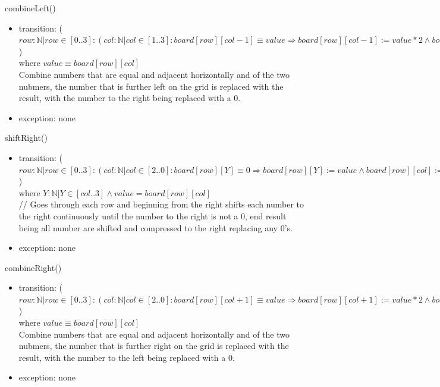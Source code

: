\documentclass[12pt]{article}
\begin{document}
\noindent combineLeft()
\begin{itemize}
    \item transition: ($row : \mathbb{N} \vert row
    \in [0..3]: (col : \mathbb{N} \vert col \in [1..3]: board[row][col-1]
    \equiv value \Rightarrow board[row][col-1] := value * 2 \land
    board[row][col] := 0 \land score := score + value * 2)$)\\
    where $value \equiv board[row][col]$\\
    Combine numbers that are equal and adjacent horizontally and of the two
    nubmers, the number that is further left on the grid is replaced with
    the result, with the number to the right being replaced with a 0.
    \item exception: none
\end{itemize}

\noindent shiftRight()
\begin{itemize}
    \item transition: ($row : \mathbb{N} \vert row
    \in [0..3]: (col : \mathbb{N} \vert col \in [2..0]:
    board[row][Y] \equiv 0 \Rightarrow board[row][Y] := value
    \land board[row][col] := 0)$)\\
    where $Y : \mathbb{N} | Y \in [col .. 3] \land value = board[row][col]$\\
    // Goes through each row and beginning from the right shifts each number
    to the right continuously until the number to the right is not a 0, end result
    being all number are shifted and compressed to the right replacing any
    0's.
    \item exception: none
\end{itemize}

\noindent combineRight()
\begin{itemize}
    \item transition: ($row : \mathbb{N} \vert row
    \in [0..3]: (col : \mathbb{N} \vert col \in [2..0]: board[row][col+1]
    \equiv value \Rightarrow board[row][col+1] := value * 2 \land
    board[row][col] := 0 \land score := score + value * 2)$)\\
    where $value \equiv board[row][col]$\\
    Combine numbers that are equal and adjacent horizontally and of the two
    nubmers, the number that is further right on the grid is replaced with
    the result, with the number to the left being replaced with a 0.
    \item exception: none
\end{itemize}
\end{document}
